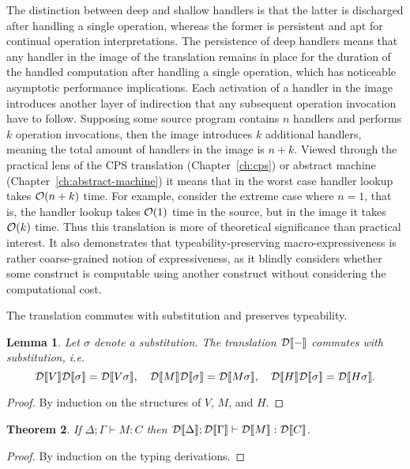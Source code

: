 \documentclass[12pt,phd,lfcs,twoside,openright,logo,leftchapter,normalheadings]{infthesis}
\theoremstyle{plain}
\newtheorem{theorem}{Theorem}[chapter]
\newtheorem{lemma}[theorem]{Lemma}
\theoremstyle{definition}
\begin{document}
The distinction between deep and shallow handlers is that the latter
is discharged after handling a single operation, whereas the former is
persistent and apt for continual operation interpretations. The
persistence of deep handlers means that any handler in the image of
the translation remains in place for the duration of the handled
computation after handling a single operation, which has noticeable
asymptotic performance implications. Each activation of a handler in
the image introduces another layer of indirection that any subsequent
operation invocation have to follow. Supposing some source program
contains $n$ handlers and performs $k$ operation invocations, then the
image introduces $k$ additional handlers, meaning the total amount of
handlers in the image is $n+k$. Viewed through the practical lens of
the CPS translation (Chapter~\ref{ch:cps}) or abstract machine
(Chapter~\ref{ch:abstract-machine}) it means that in the worst case
handler lookup takes $\mathcal{O}(n+k)$ time. For example, consider the
extreme case where $n = 1$, that is, the handler lookup takes
$\mathcal{O}(1)$ time in the source, but in the image it takes $\mathcal{O}(k)$
time.
%
Thus this translation is more of theoretical significance than
practical interest. It also demonstrates that typeability-preserving
macro-expressiveness is rather coarse-grained notion of
expressiveness, as it blindly considers whether some construct is
computable using another construct without considering the
computational cost.

The translation commutes with substitution and preserves typeability.
%
\begin{lemma}\label{lem:sdtrans-subst}
  Let $\sigma$ denote a substitution. The translation $\mathcal{D}\llbracket - \rrbracket$
  commutes with substitution, i.e.
  \[
    \mathcal{D}\llbracket V \rrbracket\mathcal{D}\llbracket \sigma \rrbracket = \mathcal{D}\llbracket V\sigma \rrbracket,\quad
    \mathcal{D}\llbracket M \rrbracket\mathcal{D}\llbracket \sigma \rrbracket = \mathcal{D}\llbracket M\sigma \rrbracket,\quad
    \mathcal{D}\llbracket H \rrbracket\mathcal{D}\llbracket \sigma \rrbracket = \mathcal{D}\llbracket H\sigma \rrbracket.
  \]
\end{lemma}
%
\begin{proof}
  By induction on the structures of $V$, $M$, and $H$.
\end{proof}
%
\begin{theorem}
If $\Delta; \Gamma \vdash M : C$ then $\mathcal{D}\llbracket \Delta \rrbracket;
\mathcal{D}\llbracket \Gamma \rrbracket \vdash \mathcal{D}\llbracket M \rrbracket : \mathcal{D}\llbracket C \rrbracket$.
\end{theorem}
%
\begin{proof}
  By induction on the typing derivations.
\end{proof}

\newcommand{\admin}{admin}
\newcommand{\approxa}{\gtrsim}
\end{document}
